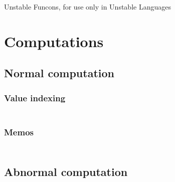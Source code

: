 Unstable Funcons, for use only in Unstable Languages

\section*{Computations}\hypertarget{computations}{}\label{computations}

\subsection*{Normal computation}\hypertarget{normal-computation}{}\label{normal-computation}

\subsubsection*{Value indexing}\hypertarget{value-indexing}{}\label{value-indexing}

\begin{align*}
  [ ~ 
  \KEY{Entity} ~ & \NAMEHYPER{../Computations/Normal}{Indexing}{value-index} \\
  \KEY{Funcon} ~ & \NAMEHYPER{../Computations/Normal}{Indexing}{initialise-index} \\
  \KEY{Funcon} ~ & \NAMEHYPER{../Computations/Normal}{Indexing}{allocate-index} \\
  \KEY{Funcon} ~ & \NAMEHYPER{../Computations/Normal}{Indexing}{lookup-index}
  ~ ]
\end{align*}
\subsubsection*{Memos}\hypertarget{memos}{}\label{memos}

\begin{align*}
  [ ~ 
  \KEY{Entity} ~ & \NAMEHYPER{../Computations/Normal}{Memos}{memo-map} \\
  \KEY{Funcon} ~ & \NAMEHYPER{../Computations/Normal}{Memos}{initialise-memos} \\
  \KEY{Funcon} ~ & \NAMEHYPER{../Computations/Normal}{Memos}{memo-value} \\
  \KEY{Funcon} ~ & \NAMEHYPER{../Computations/Normal}{Memos}{initialise-memo-value} \\
  \KEY{Funcon} ~ & \NAMEHYPER{../Computations/Normal}{Memos}{memo-value-recall}
  ~ ]
\end{align*}
\subsection*{Abnormal computation}\hypertarget{abnormal-computation}{}\label{abnormal-computation}

